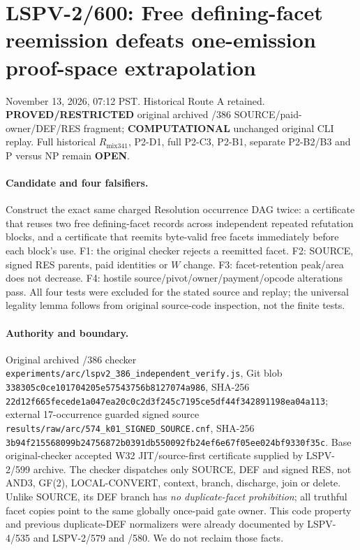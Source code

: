 \documentclass[11pt]{article}
\begin{document}
\section*{LSPV-2/600: Free defining-facet reemission defeats one-emission proof-space extrapolation}
\noindent November 13, 2026, 07:12 PST. Historical Route A retained. 
\textbf{PROVED/RESTRICTED} original archived /386 SOURCE/paid-owner/DEF/RES fragment;
\textbf{COMPUTATIONAL} unchanged original CLI replay. Full historical $R_{\mathrm{mix341}}$, P2-D1, full P2-C3, P2-B1, separate P2-B2/B3 and P versus NP remain \textbf{OPEN}.

\paragraph{Candidate and four falsifiers.}
Construct the exact same charged Resolution occurrence DAG twice: a certificate that reuses two free defining-facet records across independent repeated refutation blocks, and a certificate that reemits byte-valid free facets immediately before each block's use. F1: the original checker rejects a reemitted facet. F2: SOURCE, signed RES parents, paid identities or $W$ change. F3: facet-retention peak/area does not decrease. F4: hostile source/pivot/owner/payment/opcode alterations pass. All four tests were excluded for the stated source and replay; the universal legality lemma follows from original source-code inspection, not the finite tests.

\paragraph{Authority and boundary.}
Original archived /386 checker \texttt{experiments/arc/lspv2\_386\_independent\_verify.js}, Git blob \texttt{338305c0ce101704205e57543756b8127074a986}, SHA-256 \texttt{22d12f665fecede1a047ea20c0c2d3f245c7195ce5df44f342891198ea04a113}; external 17-occurrence guarded signed source \texttt{results/raw/arc/574\_k01\_SIGNED\_SOURCE.cnf}, SHA-256 \texttt{3b94f215568099b24756872b0391db550092fb24ef6e67f05ee024bf9330f35c}. Base original-checker accepted W32 JIT/source-first certificate supplied by LSPV-2/599 archive. The checker dispatches only SOURCE, DEF and signed RES, not AND3, GF(2), LOCAL-CONVERT, context, branch, discharge, join or delete. Unlike SOURCE, its DEF branch has \emph{no duplicate-facet prohibition}; all truthful facet copies point to the same globally once-paid gate owner. This code property and previous duplicate-DEF normalizers were already documented by LSPV-4/535 and LSPV-2/579 and /580. We do not reclaim those facts.
\end{document}
